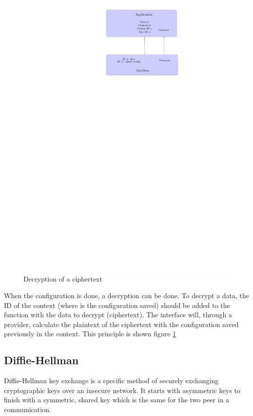 \begin{figure}[!ht]
\centering
\includegraphics[trim=13cm 20.5cm 10cm 0cm]{figures/cipher_decrypt.pdf}
\caption{Decryption of a ciphertext}
\label{fig:gci_cipher_decrypt}
\end{figure}
When the configuration is done, a decryption can be done.
To decrypt a data, the ID of the context (where is the configuration saved)
should be added to the function with the data to decrypt (ciphertext).
The interface will, through a provider, calculate the plaintext of the
ciphertext with the configuration saved previously in the context.
This principle is shown figure \ref{fig:gci_cipher_decrypt}


\subsection{Diffie-Hellman}
\label{gci_dh}

Diffie-Hellman key exchange is a specific method of securely exchanging
cryptographic keys over an insecure network. It starts with asymmetric keys to finish with a
symmetric, shared key which is the same for the two peer in a communication.

